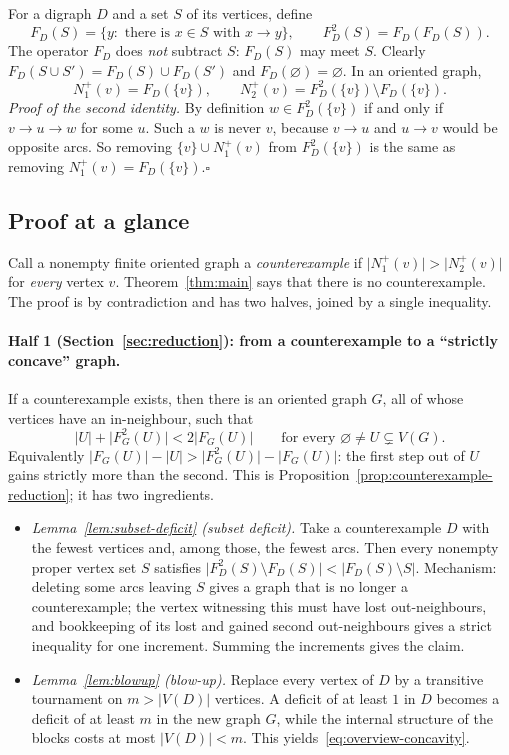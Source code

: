 \documentclass[11pt]{article}
\theoremstyle{remark}
\newcommand{\abs}[1]{\lvert #1\rvert}
\begin{document}
For a digraph \(D\) and a set \(S\) of its vertices, define
\[
 F_D(S)=\{y:\text{ there is }x\in S\text{ with }x\to y\},
 \qquad F_D^2(S)=F_D(F_D(S)).
\]
The operator \(F_D\) does \emph{not} subtract \(S\): $F_D(S)$ may meet $S$.
Clearly $F_D(S\cup S')=F_D(S)\cup F_D(S')$ and $F_D(\varnothing)=\varnothing$.
In an oriented graph,
\begin{equation}\label{eq:exact-second}
 N_1^+(v)=F_D(\{v\}),\qquad N_2^+(v)=F_D^2(\{v\})\setminus F_D(\{v\}).
\end{equation}
\emph{Proof of the second identity.} By definition $w\in F_D^2(\{v\})$ if and
only if $v\to u\to w$ for some $u$. Such a $w$ is never $v$, because
$v\to u$ and $u\to v$ would be opposite arcs. So removing
$\{v\}\cup N_1^+(v)$ from $F_D^2(\{v\})$ is the same as removing
$N_1^+(v)=F_D(\{v\})$.\hfill$\square$

\subsection{Proof at a glance}

Call a nonempty finite oriented graph a \emph{counterexample} if
$\abs{N_1^+(v)}>\abs{N_2^+(v)}$ for \emph{every} vertex $v$.
Theorem~\ref{thm:main} says that there is no counterexample. The proof is by
contradiction and has two halves, joined by a single inequality.

\paragraph{Half 1 (Section~\ref{sec:reduction}): from a counterexample to a
``strictly concave'' graph.}
If a counterexample exists, then there is an oriented graph $G$, all of
whose vertices have an in-neighbour, such that
\begin{equation}\label{eq:overview-concavity}
 \abs{U}+\abs{F_G^2(U)}<2\abs{F_G(U)}
 \qquad\text{for every }\varnothing\ne U\subsetneq V(G).
\end{equation}
Equivalently $\abs{F_G(U)}-\abs U>\abs{F_G^2(U)}-\abs{F_G(U)}$: the first
step out of $U$ gains strictly more than the second. This is
Proposition~\ref{prop:counterexample-reduction}; it has two ingredients.
\begin{itemize}[leftmargin=2em]
\item \emph{Lemma~\ref{lem:subset-deficit} (subset deficit).} Take a
counterexample $D$ with the fewest vertices and, among those, the fewest
arcs. Then every nonempty proper vertex set $S$ satisfies
$\abs{F_D^2(S)\setminus F_D(S)}<\abs{F_D(S)\setminus S}$.
Mechanism: deleting some arcs leaving $S$ gives a graph that is no longer a
counterexample; the vertex witnessing this must have lost out-neighbours,
and bookkeeping of its lost and gained second out-neighbours gives a strict
inequality for one increment. Summing the increments gives the claim.
\item \emph{Lemma~\ref{lem:blowup} (blow-up).} Replace every vertex of $D$ by
a transitive tournament on $m>\abs{V(D)}$ vertices. A deficit of at least
$1$ in $D$ becomes a deficit of at least $m$ in the new graph $G$, while
the internal structure of the blocks costs at most $\abs{V(D)}<m$. This
yields~\eqref{eq:overview-concavity}.
\end{itemize}
\end{document}
